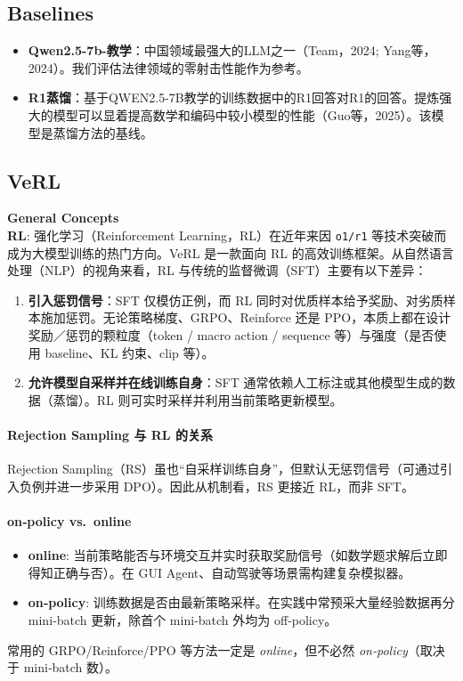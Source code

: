 \documentclass{pkuthesis}
\begin{document}
\subsection{Baselines}
\begin{itemize}
    \item \textbf{Qwen2.5-7b-教学}：中国领域最强大的LLM之一（Team，2024; Yang等，2024）。我们评估法律领域的零射击性能作为参考。
    \item \textbf{R1蒸馏}：基于QWEN2.5-7B教学的训练数据中的R1回答对R1的回答。提炼强大的模型可以显着提高数学和编码中较小模型的性能（Guo等，2025）。该模型是蒸馏方法的基线。
\end{itemize}

\subsection{VeRL}
\textbf{General Concepts}\\
\textbf{RL}: 强化学习（Reinforcement Learning，RL）在近年来因 \texttt{o1/r1} 等技术突破而成为大模型训练的热门方向。VeRL 是一款面向 RL 的高效训练框架。从自然语言处理（NLP）的视角来看，RL 与传统的监督微调（SFT）主要有以下差异：
\begin{enumerate}
    \item \textbf{引入惩罚信号}：SFT 仅模仿正例，而 RL 同时对优质样本给予奖励、对劣质样本施加惩罚。无论策略梯度、GRPO、Reinforce 还是 PPO，本质上都在设计奖励／惩罚的颗粒度（token / macro action / sequence 等）与强度（是否使用 baseline、KL 约束、clip 等）。
    \item \textbf{允许模型自采样并在线训练自身}：SFT 通常依赖人工标注或其他模型生成的数据（蒸馏）。RL 则可实时采样并利用当前策略更新模型。
\end{enumerate}

\paragraph{Rejection Sampling 与 RL 的关系}
Rejection Sampling（RS）虽也“自采样训练自身”，但默认无惩罚信号（可通过引入负例并进一步采用 DPO）。因此从机制看，RS 更接近 RL，而非 SFT。

\paragraph{on‐policy vs.\ online}
\begin{itemize}
    \item \textbf{online}: 当前策略能否与环境交互并实时获取奖励信号（如数学题求解后立即得知正确与否）。在 GUI Agent、自动驾驶等场景需构建复杂模拟器。
    \item \textbf{on‐policy}: 训练数据是否由最新策略采样。在实践中常预采大量经验数据再分 mini‐batch 更新，除首个 mini‐batch 外均为 off‐policy。
\end{itemize}
常用的 GRPO/Reinforce/PPO 等方法一定是 \emph{online}，但不必然 \emph{on‐policy}（取决于 mini‐batch 数）。
\end{document}
